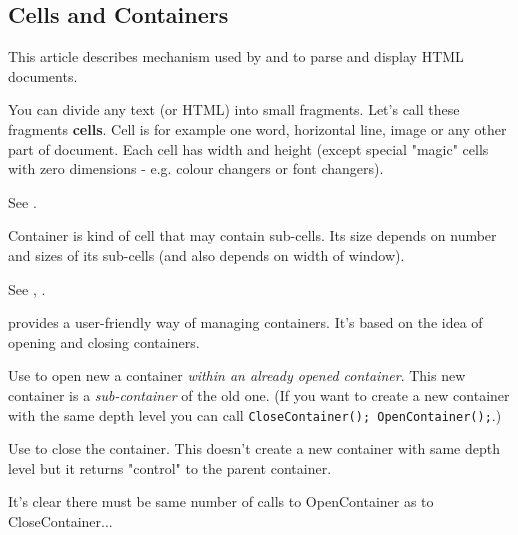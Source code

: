 \subsection{Cells and Containers}\label{cells}

This article describes mechanism used by 
 and 
 to parse and display HTML documents.


You can divide any text (or HTML) into small fragments. Let's call these
fragments {\bf cells}. Cell is for example one word, horizontal line, image
or any other part of document. Each cell has width and height (except special
"magic" cells with zero dimensions - e.g. colour changers or font changers).

See .


Container is kind of cell that may contain sub-cells. Its size depends
on number and sizes of its sub-cells (and also depends on width of window). 

See , 
.

\begin{comment}
This image shows you cells and containers:

\image{}{contbox.bmp}
\end{comment}

 provides a user-friendly way
of managing containers. It's based on the idea of opening and closing containers.

Use  to open new
a container {\it within an already opened container}. This new container is a 
{\it sub-container} of the old one. (If you want to create a new container with
the same depth level you can call {\tt CloseContainer(); OpenContainer();}.)

Use  to close the 
container. This doesn't create a new container with same depth level but
it returns "control" to the parent container.

\begin{comment}
See explanation:

\image{}{cont.bmp}
\end{comment}
It's clear there must be same number of calls to 
OpenContainer as to CloseContainer...

